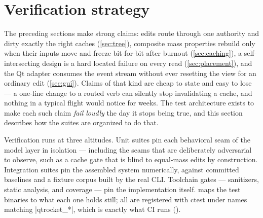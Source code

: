\section{Verification strategy}\label{sec:verification}

The preceding sections make strong claims: edits route through one authority and dirty exactly the
right caches (\cref{sec:tree}), composite mass properties rebuild only when their inputs move and
freeze bit-for-bit after burnout (\cref{sec:caching}), a self-intersecting design is a hard located
failure on every read (\cref{sec:placement}), and the Qt adapter consumes the event stream without
ever resetting the view for an ordinary edit (\cref{sec:gui}). Claims of that kind are cheap to
state and easy to lose --- a one-line change to a routed verb can silently stop invalidating a
cache, and nothing in a typical flight would notice for weeks. The test architecture exists to make
each such claim \emph{fail loudly} the day it stops being true, and this section describes how the
suites are organized to do that.

Verification runs at three altitudes. Unit suites pin each behavioral seam of the model layer in
isolation --- including the seams that are deliberately adversarial to observe, such as a cache
gate that is blind to equal-mass edits by construction. Integration suites pin the assembled
system numerically, against committed baselines and a fixture corpus built by the real CLI.
Toolchain gates --- sanitizers, static analysis, and coverage --- pin the implementation itself.
 maps the test binaries to what each one holds still; all are
registered with ctest under names matching \cppinline|qtrocket_*|, which is exactly what CI runs
().

